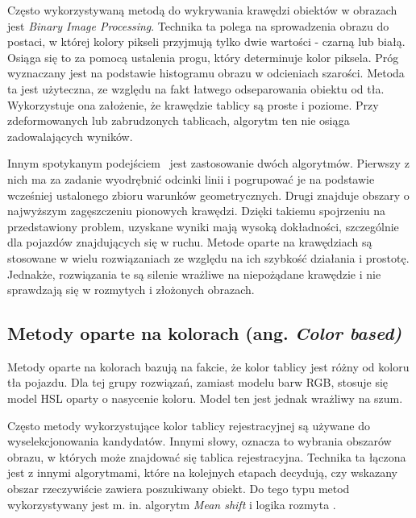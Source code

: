 Często wykorzystywaną metodą do wykrywania krawędzi obiektów w obrazach jest \textit{Binary Image Processing}.
Technika ta polega na sprowadzenia obrazu do postaci, w której kolory pikseli przyjmują tylko dwie wartości - czarną lub białą.
Osiąga się to za pomocą ustalenia progu, który determinuje kolor piksela.
Próg wyznaczany jest na podstawie histogramu obrazu w odcieniach szarości.
Metoda ta jest użyteczna, ze względu na fakt łatwego odseparowania obiektu od tła.
Wykorzystuje ona założenie, że krawędzie tablicy są proste i poziome.
Przy zdeformowanych lub zabrudzonych tablicach, algorytm ten nie osiąga zadowalających wyników.

Innym spotykanym podejściem~\cite{4410602} jest zastosowanie dwóch algorytmów.
Pierwszy z nich ma za zadanie wyodrębnić odcinki linii i pogrupować je na podstawie wcześniej ustalonego zbioru warunków geometrycznych.
Drugi znajduje obszary o najwyższym zagęszczeniu pionowych krawędzi.
Dzięki takiemu spojrzeniu na przedstawiony problem, uzyskane wyniki mają wysoką dokładności, szczególnie dla pojazdów znajdujących się w ruchu.
Metode oparte na krawędziach są stosowane w wielu rozwiązaniach ze względu na ich szybkość działania i prostotę.
Jednakże, rozwiązania te są silenie wrażliwe na niepożądane krawędzie i nie sprawdzają się w rozmytych i złożonych obrazach.

\subsection{Metody oparte na kolorach (ang. \textit{Color based)}}
Metody oparte na kolorach bazują na fakcie, że kolor tablicy jest różny od koloru tła pojazdu.
Dla tej grupy rozwiązań, zamiast modelu barw RGB, stosuje się model HSL oparty o nasycenie koloru.
Model ten jest jednak wrażliwy na szum.

Często metody wykorzystujące kolor tablicy rejestracyjnej są używane do wyselekcjonowania kandydatów.
Innymi słowy, oznacza to wybrania obszarów obrazu, w których może znajdować się tablica rejestracyjna.
Technika ta łączona jest z innymi algorytmami, które na kolejnych etapach decydują, czy wskazany obszar rzeczywiście zawiera poszukiwany obiekt.
Do tego typu metod wykorzystywany jest m. in. algorytm \textit{Mean shift} \cite{1520110} i logika rozmyta \cite{Wang2008FuzzybasedAF}.

